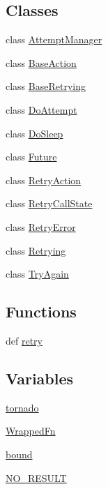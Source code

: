 \subsection*{Classes}
\begin{DoxyCompactItemize}
\item 
class \hyperlink{classpip_1_1__vendor_1_1tenacity_1_1AttemptManager}{Attempt\+Manager}
\item 
class \hyperlink{classpip_1_1__vendor_1_1tenacity_1_1BaseAction}{Base\+Action}
\item 
class \hyperlink{classpip_1_1__vendor_1_1tenacity_1_1BaseRetrying}{Base\+Retrying}
\item 
class \hyperlink{classpip_1_1__vendor_1_1tenacity_1_1DoAttempt}{Do\+Attempt}
\item 
class \hyperlink{classpip_1_1__vendor_1_1tenacity_1_1DoSleep}{Do\+Sleep}
\item 
class \hyperlink{classpip_1_1__vendor_1_1tenacity_1_1Future}{Future}
\item 
class \hyperlink{classpip_1_1__vendor_1_1tenacity_1_1RetryAction}{Retry\+Action}
\item 
class \hyperlink{classpip_1_1__vendor_1_1tenacity_1_1RetryCallState}{Retry\+Call\+State}
\item 
class \hyperlink{classpip_1_1__vendor_1_1tenacity_1_1RetryError}{Retry\+Error}
\item 
class \hyperlink{classpip_1_1__vendor_1_1tenacity_1_1Retrying}{Retrying}
\item 
class \hyperlink{classpip_1_1__vendor_1_1tenacity_1_1TryAgain}{Try\+Again}
\end{DoxyCompactItemize}
\subsection*{Functions}
\begin{DoxyCompactItemize}
\item 
def \hyperlink{namespacepip_1_1__vendor_1_1tenacity_a0acaaa84961d4d70551f0d7a5662581d}{retry}
\end{DoxyCompactItemize}
\subsection*{Variables}
\begin{DoxyCompactItemize}
\item 
\hyperlink{namespacepip_1_1__vendor_1_1tenacity_a353eae01e9dbe7bef6a704aae9556feb}{tornado}
\item 
\hyperlink{namespacepip_1_1__vendor_1_1tenacity_a8f769ca8e15c471b0617bc0906a9a517}{Wrapped\+Fn}
\item 
\hyperlink{namespacepip_1_1__vendor_1_1tenacity_a3bc11dbe8d716bd870e3c568faf6491c}{bound}
\item 
\hyperlink{namespacepip_1_1__vendor_1_1tenacity_a030166783be14a9ba79952b354231a82}{N\+O\+\_\+\+R\+E\+S\+U\+LT}
\end{DoxyCompactItemize}


